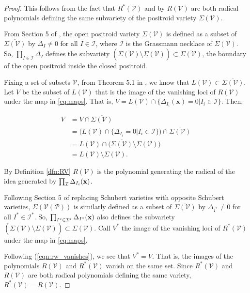 \documentclass[11pt]{article}
\newcommand{\cP}{\mathcal{P}}
\newcommand{\cV}{\mathcal{V}}
\newcommand{\VP}{\cV(\cP)}
\theoremstyle{remark}
\theoremstyle{definition}
\begin{document}
\begin{proof}
This follows from the fact that $R^{\ast}(\cV)$ and by $R(\cV)$ are both radical polynomials defining the same subvariety of the positroid variety $\Sigma(\cV)$. 

From Section 5 of \cite{Juggling}, the open positroid variety $\Sigma(\cV)$ is defined as a subset of $\overline{\Sigma(\cV)}$ by $\Delta_I \neq 0$ for all $I \in \mathcal{I}$, where $\mathcal{I}$ is the Grassmann necklace of $\Sigma(\cV)$. So, $\prod_{I \in \mathcal{I}} \Delta_I$ defines the subvariety $(\overline{\Sigma(\cV)} \setminus \Sigma(\cV)) \subset \overline{\Sigma(\cV)}$, the boundary of the open positroid inside the closed positroid. 

Fixing a set of subsets $\cV$, from Theorem 5.1 in \cite{basisshapeloci}, we know that $L(\cV) \subset \overline{\Sigma(\cV)}$. Let $V$ be the subset of $L(\cV)$ that is the image of the vanishing loci of $R(\cV)$ under the map in \eqref{eq:maps}. That is, $V = L(\cV) \cap \{\Delta_{I_i}(\mathbf{x}) = 0 | I_i \in \mathcal{I}\}$. Then,

%
\begin{equation} \label{eqn:rw_vanishes}
\begin{split}
V & = V \cap \overline{\Sigma(\cV)} \\
& = \big(L(\cV) \cap \{\Delta_{I_i} = 0 |  I_i \in \mathcal{I}\}\big) \cap \overline{\Sigma(\cV)} \\
& = L(\cV) \cap \big(\overline{\Sigma(\cV)} \setminus \Sigma(\cV)\big) \\
& =  L(\cV) \setminus \Sigma(\cV).
\end{split}
\end{equation}


By Definition \ref{dfn:RV} $R(\cV)$ is the polynomial generating the radical of the idea generated by $\prod_\mathcal{I} \Delta_{I_i}(\bf{x})$. 

Following Section 5 of \cite{Juggling} replacing Schubert varieties with opposite Schubert varieties, $\Sigma(\VP)$ is similarly defined as a subset of $\overline{\Sigma(\cV)}$ by $\Delta_{I^{\ast}} \neq 0$ for all $I^{\ast} \in \mathcal{I}^{\ast}$. So, $\prod_{I^{\ast} \in \mathcal{I}^{\ast}} \Delta_{I^{\ast}}(\bf{x})$ also defines the subvariety $(\overline{\Sigma(\cV)} \setminus \Sigma(\cV)) \subset \overline{\Sigma(\cV)}$. Call $V^\ast$ the image of the vanishing loci of $R^\ast(\cV)$ under the map in \eqref{eq:maps}.

Following (\ref{eqn:rw_vanishes}), we see that $V^* = V$. That is, the images of the polynomials $R(\cV)$ and $R^{\ast}(\cV)$ vanish on the same set. Since  $R^{\ast}(\cV)$ and $R(\cV)$ are both radical polynomials defining the same variety, $R^{\ast}(\cV) = R(\cV)$. 
\end{proof} 
\end{document}
